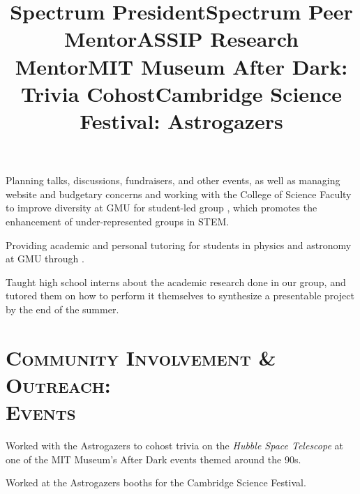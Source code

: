 \documentclass[marg, centered]{res}
\begin{document}
\begin{resume}
\title{\textbf{Spectrum President}}
\begin{position}
Planning talks, discussions, fundraisers, and other events, as well as managing website and budgetary concerns and working with the College of Science Faculty to improve diversity at GMU for student-led group \href{https://gmuspectrum.squarespace.com/}{\color{dkbu}{Spectrum}}, which promotes the enhancement of under-represented groups in STEM.
\end{position}

\title{\textbf{Spectrum Peer Mentor}}
\begin{position}
Providing academic and personal tutoring for students in physics and astronomy at GMU through \href{https://gmuspectrum.squarespace.com/}{\color{dkbu}{Spectrum}}.
\end{position}

\title{\textbf{ASSIP Research Mentor}}
\begin{position}
Taught high school interns about the academic research done in our group, and tutored them on how to perform it themselves to synthesize a presentable project by the end of the summer.
\end{position}


\section{{\scshape \bfseries Community Involvement \& Outreach:\\ Events}}

\title{\textbf{MIT Museum After Dark: Trivia Cohost}}
\begin{position}
Worked with the Astrogazers to cohost trivia on the \textit{Hubble Space Telescope} at one of the MIT Museum's After Dark events themed around the 90s.
\end{position}

\title{\textbf{Cambridge Science Festival: Astrogazers}}
\begin{position}
Worked at the Astrogazers booths for the Cambridge Science Festival.
\end{position}


\end{resume}
\end{document}
